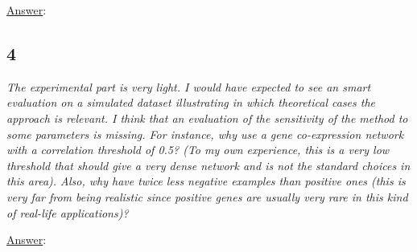 \documentclass[11pt]{article}
\begin{document}
\underline{Answer}: 

\subsection*{4} \textit{The experimental part is very light. I would have expected to see an smart evaluation on a simulated dataset illustrating in which theoretical cases the approach is relevant. I think that an evaluation of the sensitivity of the method to some parameters is missing. For instance, why use a gene co-expression network with a correlation threshold of 0.5? (To my own experience, this is a very low threshold that should give a very dense network and is not the standard choices in this area). Also, why have twice less negative examples than positive ones (this is very far from being realistic since positive genes are usually very rare in this kind of real-life applications)?} 

\underline{Answer}: 
\end{document}
